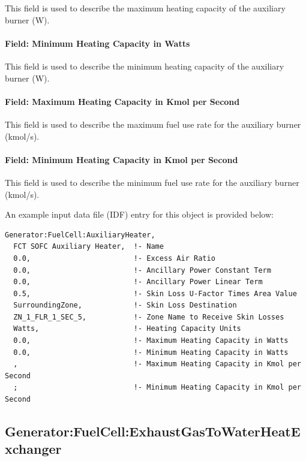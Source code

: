 This field is used to describe the maximum heating capacity of the auxiliary burner (W).

\paragraph{Field: Minimum Heating Capacity in Watts}\label{field-minimum-heating-capacity-in-watts}

This field is used to describe the minimum heating capacity of the auxiliary burner (W).

\paragraph{Field: Maximum Heating Capacity in Kmol per Second}\label{field-maximum-heating-capacity-in-kmol-per-second}

This field is used to describe the maximum fuel use rate for the auxiliary burner (kmol/s).

\paragraph{Field: Minimum Heating Capacity in Kmol per Second}\label{field-minimum-heating-capacity-in-kmol-per-second}

This field is used to describe the minimum fuel use rate for the auxiliary burner (kmol/s).

An example input data file (IDF) entry for this object is provided below:

\begin{lstlisting}
Generator:FuelCell:AuxiliaryHeater,
  FCT SOFC Auxiliary Heater,  !- Name
  0.0,                        !- Excess Air Ratio
  0.0,                        !- Ancillary Power Constant Term
  0.0,                        !- Ancillary Power Linear Term
  0.5,                        !- Skin Loss U-Factor Times Area Value
  SurroundingZone,            !- Skin Loss Destination
  ZN_1_FLR_1_SEC_5,           !- Zone Name to Receive Skin Losses
  Watts,                      !- Heating Capacity Units
  0.0,                        !- Maximum Heating Capacity in Watts
  0.0,                        !- Minimum Heating Capacity in Watts
  ,                           !- Maximum Heating Capacity in Kmol per Second
  ;                           !- Minimum Heating Capacity in Kmol per Second
\end{lstlisting}

\subsection{Generator:FuelCell:ExhaustGasToWaterHeatExchanger}\label{generator-fuelcell-exhaustgastowaterheatexchanger}

